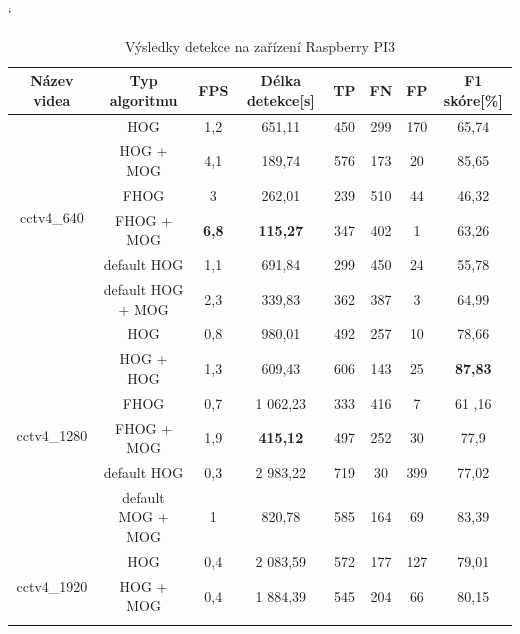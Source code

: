 \begin{table}[H]
\catcode`
\centering
\caption{Výsledky detekce na zařízení Raspberry PI3}
\label{resultTabRPI3}
\begin{tabular}{|c|c|c|c|c|c|c|c|}
\hline
{Název videa}        & Typ algoritmu    & FPS & Délka detekce[s]      & TP          & FN      & FP      & F1 skóre[\%] \\  \hline
\multirow{6}{*}{cctv4\_640}   & HOG &   1,2            & 651,11       & 450 &   299 &     170 &     65,74      \\ \cline{2-8}  
      & HOG + MOG                    &  4,1            & 189,74       & 576 &   173 &     20 &      85,65      \\ \cline{2-8}  
      & FHOG                         &  3              & 262,01       & 239 &   510 &     44 &      46,32      \\ \cline{2-8}  
      & FHOG + MOG                   &  \textbf{6,8}   & \textbf{115,27}  & 347 &   402 &     1 &  63,26      \\ \cline{2-8}   
      &  default HOG                 &  1,1            & 691,84       & 299 &   450 &     24 &      55,78      \\  \cline{2-8}
      &  default HOG + MOG           &  2,3            & 339,83       & 362 &   387 &     3 &  64,99      \\ \hline \hline  
\multirow{6}{*}{cctv4\_1280}& HOG &     0,8            & 980,01       & 492 &   257 &     10 &      78,66      \\ \cline{2-8}  
      & HOG + HOG                    &  1,3            & 609,43       & 606 &   143 &     25 &      \textbf{87,83}      \\ \cline{2-8}  
      & FHOG                         &  0,7            & 1 062,23     & 333 &   416 &     7 &  61 ,16      \\ \cline{2-8}  
      & FHOG + MOG                   &  1,9            & \textbf{415,12}  & 497 &   252 &     30 &      77,9  \\ \cline{2-8} 
      &  default HOG                 &  0,3            & 2 983,22     & 719 &   30 &      399 &     77,02      \\ \cline{2-8}  
      &  default MOG + MOG           &  1              & 820,78       & 585 &   164 &     69 &      83,39      \\ \hline \hline   
\multirow{6}{*}{cctv4\_1920}& HOG &     0,4            & 2 083,59     & 572 &   177 &     127 &     79,01      \\ \cline{2-8}  
      & HOG + MOG                    &  0,4            & 1 884,39     & 545 &   204 &     66 &      80,15      \\ \cline{2-8}  

\end{tabular}
\end{table}
